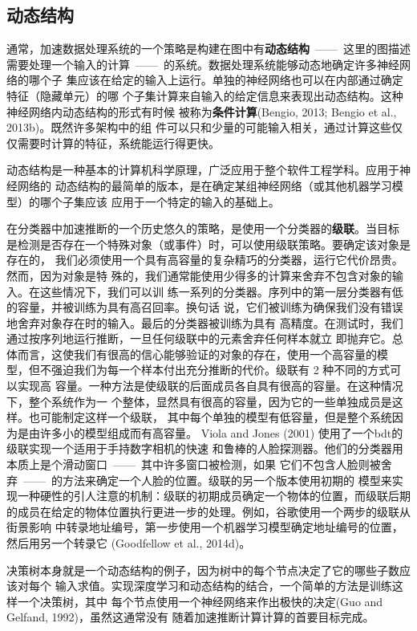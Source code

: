 \subsection{动态结构}
\label{subsec:dynamic_structure}

通常，加速数据处理系统的一个策略是构建在图中有\textbf{动态结构}~——~这里的图描述
需要处理一个输入的计算~——~的系统。数据处理系统能够动态地确定许多神经网络的哪个子
集应该在给定的输入上运行。单独的神经网络也可以在内部通过确定特征（隐藏单元）的哪
个子集计算来自输入的给定信息来表现出动态结构。这种神经网络内动态结构的形式有时候
被称为\textbf{条件计算}(Bengio, 2013; Bengio et al., 2013b)。既然许多架构中的组
件可以只和少量的可能输入相关，通过计算这些仅仅需要时计算的特征，系统能运行得更快。

动态结构是一种基本的计算机科学原理，广泛应用于整个软件工程学科。应用于神经网络的
动态结构的最简单的版本，是在确定某组神经网络（或其他机器学习模型）的哪个子集应该
应用于一个特定的输入的基础上。

在分类器中加速推断的一个历史悠久的策略，是使用一个分类器的\textbf{级联}。当目标
是检测是否存在一个特殊对象（或事件）时，可以使用级联策略。要确定该对象是存在的，
我们必须使用一个具有高容量的复杂精巧的分类器，运行它代价昂贵。然而，因为对象是特
殊的，我们通常能使用少得多的计算来舍弃不包含对象的输入。在这些情况下，我们可以训
练一系列的分类器。序列中的第一层分类器有低的容量，并被训练为具有高召回率。换句话
说，它们被训练为确保我们没有错误地舍弃对象存在时的输入。最后的分类器被训练为具有
高精度。在测试时，我们通过按序列地运行推断，一旦任何级联中的元素舍弃任何样本就立
即抛弃它。总体而言，这使我们有很高的信心能够验证的对象的存在，使用一个高容量的模
型，但不强迫我们为每一个样本付出充分推断的代价。级联有 2 种不同的方式可以实现高
容量。一种方法是使级联的后面成员各自具有很高的容量。在这种情况下，整个系统作为一
个整体，显然具有很高的容量，因为它的一些单独成员是这样。也可能制定这样一个级联，
其中每个单独的模型有低容量，但是整个系统因为是由许多小的模型组成而有高容量。
Viola and Jones (2001) 使用了一个\gls{bdt}的级联实现一个适用于手持数字相机的快速
和鲁棒的人脸探测器。他们的分类器用本质上是个滑动窗口~——~其中许多窗口被检测，如果
它们不包含人脸则被舍弃~——~的方法来确定一个人脸的位置。级联的另一个版本使用初期的
模型来实现一种硬性的引人注意的机制：级联的初期成员确定一个物体的位置，而级联后期
的成员在给定的物体位置执行更进一步的处理。例如，谷歌使用一个两步的级联从街景影响
中转录地址编号，第一步使用一个机器学习模型确定地址编号的位置，然后用另一个转录它
(Goodfellow et al., 2014d)。

决策树本身就是一个动态结构的例子，因为树中的每个节点决定了它的哪些子数应该对每个
输入求值。实现深度学习和动态结构的结合，一个简单的方法是训练这样一个决策树，其中
每个节点使用一个神经网络来作出极快的决定(Guo and Gelfand, 1992)，虽然这通常没有
随着加速推断计算计算的首要目标完成。

